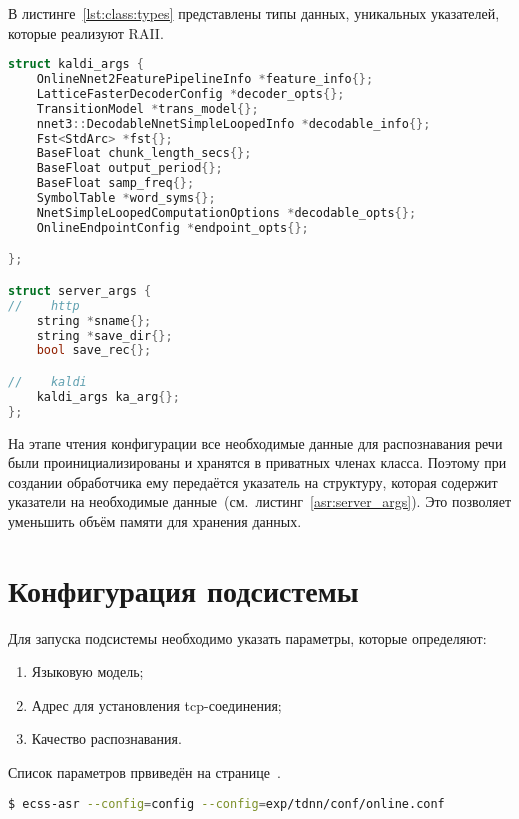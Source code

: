 В листинге~\ref{lst:class:types} представлены типы данных, уникальных указателей,
которые реализуют RAII.

\begin{lstlisting}[caption={структуры для хранения данных},label={asr:server_args},language=C++]
struct kaldi_args {
    OnlineNnet2FeaturePipelineInfo *feature_info{};
    LatticeFasterDecoderConfig *decoder_opts{};
    TransitionModel *trans_model{};
    nnet3::DecodableNnetSimpleLoopedInfo *decodable_info{};
    Fst<StdArc> *fst{};
    BaseFloat chunk_length_secs{};
    BaseFloat output_period{};
    BaseFloat samp_freq{};
    SymbolTable *word_syms{};
    NnetSimpleLoopedComputationOptions *decodable_opts{};
    OnlineEndpointConfig *endpoint_opts{};

};

struct server_args {
//    http
    string *sname{};
    string *save_dir{};
    bool save_rec{};

//    kaldi
    kaldi_args ka_arg{};
};

\end{lstlisting}

На этапе чтения конфигурации все необходимые данные для распознавания речи
были проинициализированы и хранятся в приватных членах класса. Поэтому при
создании обработчика ему передаётся указатель на структуру, которая содержит
указатели на необходимые данные~(см.~листинг~\ref{asr:server_args}). Это позволяет
уменьшить объём памяти для хранения данных.


\section{Конфигурация подсистемы}

Для запуска подсистемы необходимо указать параметры, которые определяют:
\begin{enumerate}
    \item Языковую модель;
    \item Адрес для установления tcp-соединения;
    \item Качество распознавания.
\end{enumerate}

Список параметров првиведён на странице~\pageref{kaldi:options}.
\begin{lstlisting}[caption={Запуск ASR},label={asr:run},language=bash]
$ ecss-asr --config=config --config=exp/tdnn/conf/online.conf

\end{lstlisting}

